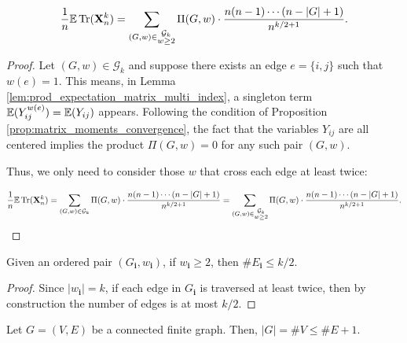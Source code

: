 \begin{lemma}
  \label{lem:equation_4.8}
  $$
\frac{1}{n} \mathbb{E} \operatorname{Tr} (\mathbf{X}_n^k) = \sum_{(G,w) \in \substack{\mathcal{G}_k \\ w \geq 2}} \Pi (G,w) \cdot \frac{n (n-1) \cdots (n - |G| + 1)}{n^{k/2+1}}.
  $$
\end{lemma}
\begin{proof}
  Let $(G,w) \in \mathcal{G}_k$ and suppose there exists an edge $e = \{i,j\}$ such that $w(e) = 1$.
  This means, in Lemma \ref{lem:prod_expectation_matrix_multi_index}, a singleton term $\mathbb{E} (Y_{ij}^{w(e)}) = \mathbb{E} (Y_{ij})$ appears.
  Following the condition of Proposition \ref{prop:matrix_moments_convergence}, the fact that the variables $Y_{ij}$ are all centered implies the product $\Pi (G,w) = 0$ for any such pair $(G,w)$.

Thus, we only need to consider those $w$ that cross each edge at least twice: 

    $$
  \frac{1}{n} \mathbb{E} \operatorname{Tr} (\mathbf{X}_n^k) = \sum_{\substack{(G,w) \in \mathcal{G}_k}} \Pi (G,w) \cdot \frac{n (n-1) \cdots (n - |G| + 1)}{n^{k/2+1}}  = \sum_{(G,w) \in \substack{\mathcal{G}_k \\ w \geq 2}} \Pi (G,w) \cdot \frac{n (n-1) \cdots (n - |G| + 1)}{n^{k/2+1}}.
  $$
\end{proof}
\begin{lemma}
  \label{lem:edge_set_order_leq_k_over_two}
  Given an ordered pair $(G_\mathbf{i},w_\mathbf{i})$, if $w_\mathbf{i} \geq 2$, then $\# E_\mathbf{i} \leq k/2$.
\end{lemma}
\begin{proof}
  Since $|w_\mathbf{i}| = k$, if each edge in $G_\mathbf{i}$ is traversed at least twice, then by construction the number of edges is at most $k/2$.
\end{proof}







\begin{proposition}%
  \label{prop:vertex_edge_inequality}
  \notready
  Let $G=(V,E)$ be a connected finite graph. Then, $|G|=\#V\le \#E+1$.
\end{proposition}

